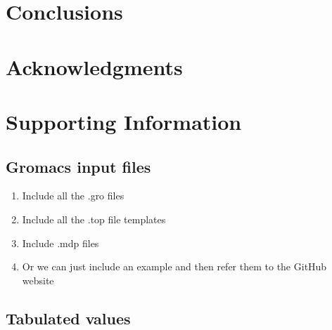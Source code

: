 \documentclass[11pt,a4paper]{article}
\begin{document}
\section{Conclusions}

\section{Acknowledgments}

\section{Supporting Information}

\subsection{Gromacs input files}

\begin{enumerate}
	\item Include all the .gro files
	\item Include all the .top file templates
	\item Include .mdp files
	\item Or we can just include an example and then refer them to the GitHub website
\end{enumerate}

\subsection{Tabulated values}
\end{document}
